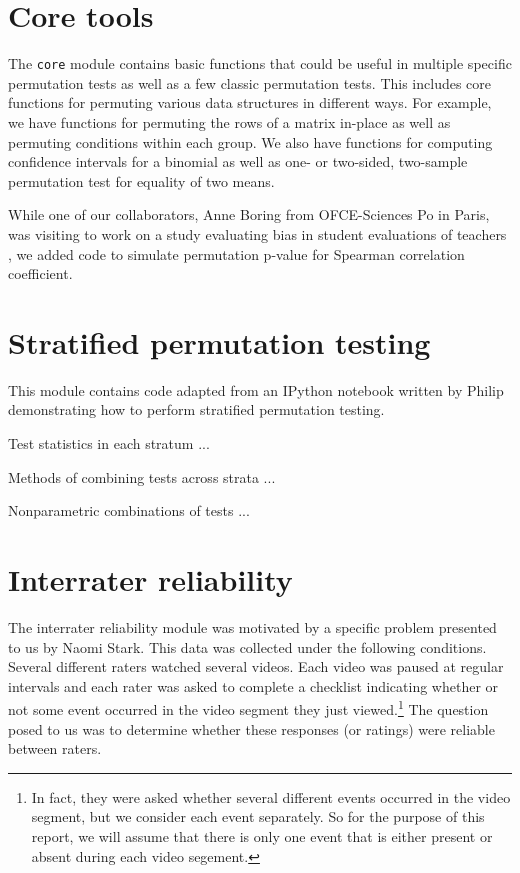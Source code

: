 \section{Core tools}

The \texttt{core} module contains basic functions that could be useful in
multiple specific permutation tests as well as a few classic permutation tests.
This includes core functions for permuting various data structures in different
ways.  For example, we have functions for permuting the rows of a matrix
in-place as well as permuting conditions within each group. We also have
functions for computing confidence intervals for a binomial as well as
one- or two-sided, two-sample permutation test for equality of two means.

While one of our collaborators, Anne Boring from OFCE-Sciences Po in Paris, was
visiting to work on a study evaluating bias in student evaluations of teachers
\cite{boring2015}, we added code to simulate permutation p-value for Spearman
correlation coefficient.

\section{Stratified permutation testing}

This module contains code adapted from an IPython notebook written by
Philip demonstrating how to perform stratified permutation testing.

Test statistics in each stratum ...

Methods of combining tests across strata ...

Nonparametric combinations of tests ...

\section{\label{sec:irr}Interrater reliability}

The interrater reliability module was motivated by a specific problem presented
to us by Naomi Stark.  This data was collected under the following conditions.
Several different raters watched several videos.  Each video was paused at
regular intervals and each rater was asked to complete a checklist indicating
whether or not some event occurred in the video segment they just
viewed.\footnote{In fact, they were asked whether several different events
occurred in the video segment, but we consider each event separately.  So for
the purpose of this report, we will assume that there is only one event that is
either present or absent during each video segement.} The question posed to us
was to determine whether these responses (or ratings) were reliable between
raters. 


